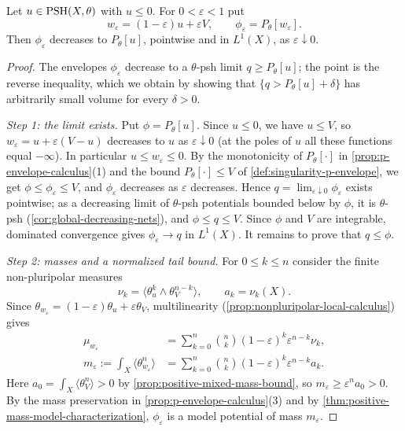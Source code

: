 \begin{proposition}\label{prop:positive-mass-singularity-envelope-limit}
Let $u\in\mathrm{PSH}(X,\theta)$ with $u\leq0$. For $0<\varepsilon<1$ put
\[
 w_\varepsilon=(1-\varepsilon)u+\varepsilon V,
 \qquad \phi_\varepsilon=P_\theta[w_\varepsilon].
\]
Then $\phi_\varepsilon$ decreases to $P_\theta[u]$, pointwise and in $L^1(X)$, as $\varepsilon\downarrow0$.
\end{proposition}
\begin{proof}
The envelopes $\phi_\varepsilon$ decrease to a $\theta$-psh limit $q\geq P_\theta[u]$; the point is the reverse inequality, which we obtain by showing that $\{q>P_\theta[u]+\delta\}$ has arbitrarily small volume for every $\delta>0$.

\emph{Step 1: the limit exists.} Put $\phi=P_\theta[u]$. Since $u\leq0$, we have $u\leq V$, so $w_\varepsilon=u+\varepsilon(V-u)$ decreases to $u$ as $\varepsilon\downarrow0$ (at the poles of $u$ all these functions equal $-\infty$). In particular $u\leq w_\varepsilon\leq0$. By the monotonicity of $P_\theta[\cdot]$ in \cref{prop:p-envelope-calculus}(1) and the bound $P_\theta[\cdot]\leq V$ of \cref{def:singularity-p-envelope}, we get $\phi\leq\phi_\varepsilon\leq V$, and $\phi_\varepsilon$ decreases as $\varepsilon$ decreases. Hence $q=\lim_{\varepsilon\downarrow0}\phi_\varepsilon$ exists pointwise; as a decreasing limit of $\theta$-psh potentials bounded below by $\phi$, it is $\theta$-psh (\cref{cor:global-decreasing-nets}), and $\phi\leq q\leq V$. Since $\phi$ and $V$ are integrable, dominated convergence gives $\phi_\varepsilon\to q$ in $L^1(X)$. It remains to prove that $q\leq\phi$.

\emph{Step 2: masses and a normalized tail bound.} For $0\leq k\leq n$ consider the finite non-pluripolar measures
\[
 \nu_k=\langle\theta_u^k\wedge\theta_V^{n-k}\rangle,
 \qquad a_k=\nu_k(X).
\]
Since $\theta_{w_\varepsilon}=(1-\varepsilon)\theta_u+\varepsilon\theta_V$, multilinearity (\cref{prop:nonpluripolar-local-calculus}) gives
\[
 \begin{aligned}
 \mu_{w_\varepsilon}
   &=\sum_{k=0}^n\binom nk(1-\varepsilon)^k\varepsilon^{n-k}\nu_k,
 \\
 m_\varepsilon:=\int_X\langle\theta_{w_\varepsilon}^n\rangle
   &=\sum_{k=0}^n\binom nk(1-\varepsilon)^k\varepsilon^{n-k}a_k.
 \end{aligned}
\]
Here $a_0=\int_X\langle\theta_V^n\rangle>0$ by \cref{prop:positive-mixed-mass-bound}, so $m_\varepsilon\geq\varepsilon^na_0>0$. By the mass preservation in \cref{prop:p-envelope-calculus}(3) and by \cref{thm:positive-mass-model-characterization}, $\phi_\varepsilon$ is a model potential of mass $m_\varepsilon$.


\end{proof}
